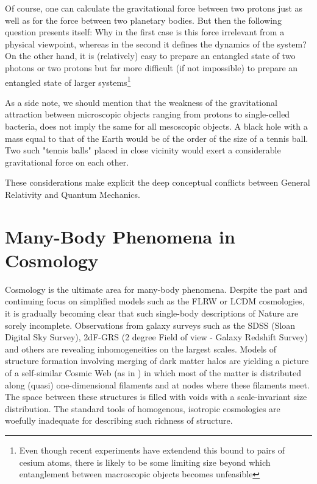 \documentclass[11pt,english,rmp]{revtex4}
\begin{document}
Of course, one can calculate the gravitational force between two protons just as well as for the force between two planetary bodies. But then the following question presents itself: Why in the first case is this force irrelevant from a physical viewpoint, whereas in the second it defines the dynamics of the system? On the other hand, it is (relatively) easy to prepare an entangled state of two photons or two protons but far more difficult (if not impossible) to prepare an entangled state of larger systems\footnote{Even though recent experiments have extendend this bound to pairs of cesium atoms, there is likely to be some limiting size beyond which entanglement between macroscopic objects becomes unfeasible}

As a side note, we should mention that the weakness of the gravitational attraction between microscopic objects ranging from protons to single-celled bacteria, does not imply the same for all mesoscopic objects. A black hole with a mass equal to that of the Earth would be of the order of the size of a tennis ball. Two such "tennis balls" placed in close vicinity would exert a considerable gravitational force on each other.

These considerations make explicit the deep conceptual conflicts between General Relativity and Quantum Mechanics.

\section{Many-Body Phenomena in Cosmology}

Cosmology is the ultimate area for many-body phenomena. Despite the past and continuing focus on simplified models such as the FLRW or LCDM cosmologies, it is gradually becoming clear that such single-body descriptions of Nature are sorely incomplete. Observations from galaxy surveys such as the SDSS (Sloan Digital Sky Survey), 2dF-GRS (2 degree Field of view - Galaxy Redshift Survey) and others are revealing inhomogeneities on the largest scales. Models of structure formation involving merging of dark matter halos are yielding a picture of a self-similar Cosmic Web (as in \cite{Sheth2003Hierarchy,Sheth2005Exploring}) in which most of the matter is distributed along (quasi) one-dimensional filaments and at nodes where these filaments meet. The space between these structures is filled with voids with a scale-invariant size distribution. The standard tools of homogenous, isotropic cosmologies are woefully inadequate for describing such richness of structure.
\end{document}
